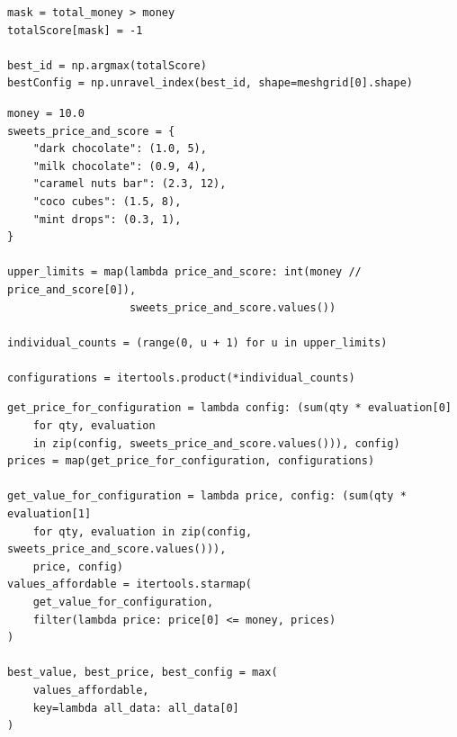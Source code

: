 \begin{frame}[fragile]
%
\begin{codebox}[... Continued]
\begin{verbatim}
mask = total_money > money
totalScore[mask] = -1

best_id = np.argmax(totalScore)
bestConfig = np.unravel_index(best_id, shape=meshgrid[0].shape)
\end{verbatim}
\end{codebox}
%
\end{frame}


\begin{frame}[fragile]
%
\begin{codebox}
\begin{verbatim}
money = 10.0
sweets_price_and_score = {
    "dark chocolate": (1.0, 5),
    "milk chocolate": (0.9, 4),
    "caramel nuts bar": (2.3, 12),
    "coco cubes": (1.5, 8),
    "mint drops": (0.3, 1),
}

upper_limits = map(lambda price_and_score: int(money // price_and_score[0]), 
                   sweets_price_and_score.values())

individual_counts = (range(0, u + 1) for u in upper_limits)

configurations = itertools.product(*individual_counts)
\end{verbatim}
\end{codebox}
%
\end{frame}


\begin{frame}[fragile]
%
\begin{codebox}[... Continued]
\begin{verbatim}
get_price_for_configuration = lambda config: (sum(qty * evaluation[0] 
    for qty, evaluation 
    in zip(config, sweets_price_and_score.values())), config)
prices = map(get_price_for_configuration, configurations)

get_value_for_configuration = lambda price, config: (sum(qty * evaluation[1]
    for qty, evaluation in zip(config, sweets_price_and_score.values())),
    price, config)
values_affordable = itertools.starmap(
    get_value_for_configuration, 
    filter(lambda price: price[0] <= money, prices)
)

best_value, best_price, best_config = max(
    values_affordable, 
    key=lambda all_data: all_data[0]
)
\end{verbatim}
\end{codebox}
%
\end{frame}


